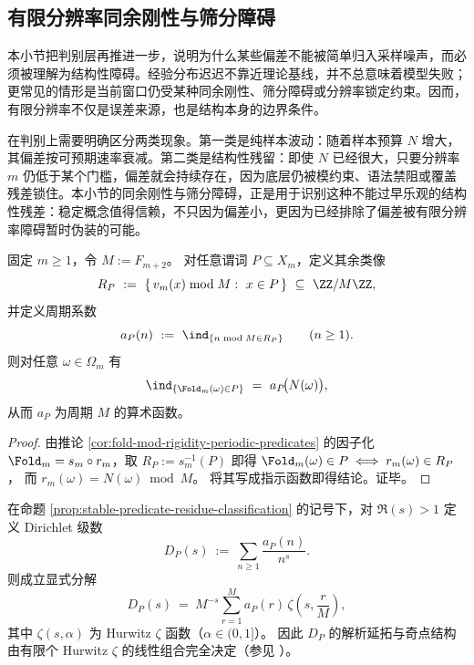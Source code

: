 \subsection{有限分辨率同余刚性与筛分障碍}\label{subsec:stat-stability-finite-resolution-congruence-obstructions}

本小节把判别层再推进一步，说明为什么某些偏差不能被简单归入采样噪声，而必须被理解为结构性障碍。经验分布迟迟不靠近理论基线，并不总意味着模型失败；更常见的情形是当前窗口仍受某种同余刚性、筛分障碍或分辨率锁定约束。因而，有限分辨率不仅是误差来源，也是结构本身的边界条件。

在判别上需要明确区分两类现象。第一类是纯样本波动：随着样本预算 \(N\) 增大，其偏差按可预期速率衰减。第二类是结构性残留：即使 \(N\) 已经很大，只要分辨率 \(m\) 仍低于某个门槛，偏差就会持续存在，因为底层仍被模约束、语法禁阻或覆盖残差锁住。本小节的同余刚性与筛分障碍，正是用于识别这种不能过早乐观的结构性残差：稳定概念值得信赖，不只因为偏差小，更因为已经排除了偏差被有限分辨率障碍暂时伪装的可能。

\begin{proposition}[稳定谓词的余类化与周期系数]\label{prop:stable-predicate-residue-classification}
固定 \(m\ge 1\)，令 \(M:=F_{m+2}\)。
对任意谓词 \(P\subseteq X_m\)，定义其余类像
\[
R_P\ :=\ \{\,v_m(x)\bmod M:\ x\in P\,\}\ \subseteq\ \ZZ/M\ZZ,
\]
并定义周期系数
\[
a_P(n)\ :=\ \ind_{\{n\bmod M\in R_P\}}\qquad(n\ge 1).
\]
则对任意 \(\omega\in\Omega_m\) 有
\[
\ind_{\{\Fold_m(\omega)\in P\}}\ =\ a_P\!\bigl(N(\omega)\bigr),
\]
从而 \(a_P\) 为周期 \(M\) 的算术函数。
\end{proposition}

\begin{proof}
由推论 \ref{cor:fold-mod-rigidity-periodic-predicates} 的因子化 \(\Fold_m=s_m\circ r_m\)，取 \(R_P:=s_m^{-1}(P)\) 即得
\(
\Fold_m(\omega)\in P\iff r_m(\omega)\in R_P
\)，
而 \(r_m(\omega)=N(\omega)\bmod M\)。
将其写成指示函数即得结论。证毕。
\end{proof}

\begin{theorem}\label{thm:periodic-dirichlet-series-hurwitz-decomposition}
在命题 \ref{prop:stable-predicate-residue-classification} 的记号下，对 \(\Re(s)>1\) 定义 Dirichlet 级数
\[
D_P(s)\ :=\ \sum_{n\ge 1}\frac{a_P(n)}{n^s}.
\]
则成立显式分解
\[
D_P(s)\ =\ M^{-s}\sum_{r=1}^{M} a_P(r)\,\zeta\!\left(s,\frac{r}{M}\right),
\]
其中 \(\zeta(s,\alpha)\) 为 Hurwitz \(\zeta\) 函数（\(\alpha\in(0,1]\)）。
因此 \(D_P\) 的解析延拓与奇点结构由有限个 Hurwitz \(\zeta\) 的线性组合完全决定（参见 \cite{Apostol1976,Titchmarsh1986RiemannZeta}）。
\end{theorem}

